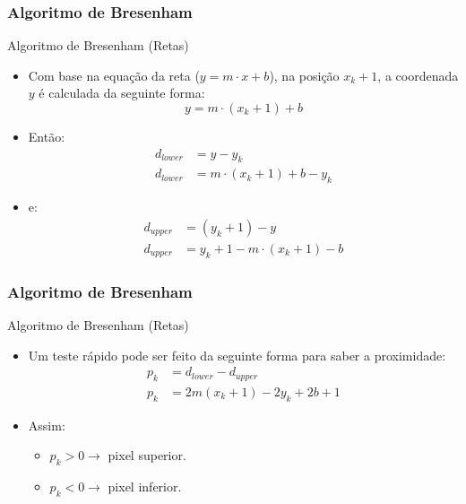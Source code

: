 \documentclass{beamer}
\begin{document}
\begin{frame}
\frametitle{Algoritmo de Bresenham}
		\begin{block}{Algoritmo de Bresenham (Retas)}
		\begin{itemize}
			\item Com base na equação da reta ($y = m \cdot x + b$), na posição $x_k+1$, a coordenada $y$ é calculada da seguinte forma:
			\begin{equation*}
				y = m \cdot (x_k+1) + b
			\end{equation*}
			\item Então:
				\begin{align*}
					d_{lower} &= y - y_k \\
					d_{lower} &= m\cdot (x_k+1) +b -y_k
				\end{align*}
			\item e:
				\begin{align*}
					d_{upper} &= (y_k+1)-y \\
					d_{upper} &= y_k+1 - m \cdot (x_k+1) - b
				\end{align*}
		\end{itemize}
	\end{block}
\end{frame}

\begin{frame}
\frametitle{Algoritmo de Bresenham}
		\begin{block}{Algoritmo de Bresenham (Retas)}
		\begin{itemize}
			\item Um teste rápido pode ser feito da seguinte forma para saber a proximidade:
					\begin{align}
						p_k &= d_{lower} - d_{upper} \\
						p_k &= 2m(x_k+1) - 2y_k+2b+1
					\end{align}
			\item Assim:
				\begin{itemize}
					\item $p_k > 0 \to$ pixel superior.
					\item $p_k < 0 \to$ pixel inferior. 
				\end{itemize}
		\end{itemize}
	\end{block}
\end{frame}
\end{document}
